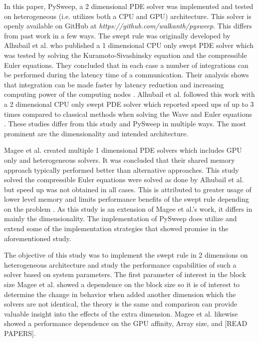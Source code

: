 \documentclass[review]{elsarticle}
\def\github{https://github.com/walkanth/pysweep}
\begin{document}
\par
In this paper, PySweep, a 2 dimensional PDE solver was implemented and tested on heterogeneous (i.e. utilizes both a CPU and GPU) architecture. This solver is openly available on GitHub at \textit{\github}. This differs from past work in a few ways. The swept rule was originally developed by Alhubail et al. who published a 1 dimensional CPU only swept PDE solver which was tested by solving the Kuramoto-Sivashinsky equation and the compressible Euler equations. They concluded that in each case a number of integrations can be performed during the latency time of a communication. Their analysis shows that integration can be made faster by latency reduction and increasing computing power of the computing nodes \cite{Alhubail2016ThePDEs}. Alhubail et al. followed this work with a 2 dimensional CPU only swept PDE solver which reported speed ups of up to 3 times compared to classical methods when solving the Wave and Euler equations \cite{Alhubail2018ThePDEs}. These studies differ from this study and PySweep in multiple ways. The most prominent are the dimensionality and intended architecture.
\par
Magee et al. created multiple 1 dimensional PDE solvers which includes GPU only and heterogeneous solvers. It was concluded that their shared memory approach typically performed better than alternative approaches. This study solved the compressible Euler equations were solved as done by Alhubail et al. \cite{Alhubail2016ThePDEs} but speed up was not obtained in all cases. This is attributed to greater usage of lower level memory and limits performance benefits of the swept rule depending on the problem \cite{Magee2018AcceleratingDecomposition}. As this study is an extension of Magee et al.'s work, it differs in mainly the dimensionality. The implementation of PySweep does utilize and extend some of the implementation strategies that showed promise in the aforementioned study.

\par
The objective of this study was to implement the swept rule in 2 dimensions on heterogeneous architecture and study the performance capabilities of such a solver based on system parameters. The first parameter of interest in the block size Magee et al. showed a dependence on the block size so it is of interest to determine the change in behavior when added another dimension which the solvers are not identical, the theory is the same and comparison can provide valuable insight into the effects of the extra dimension. Magee et al. likewise showed a performance dependence on the GPU affinity, Array size, and [READ PAPERS].
\end{document}
